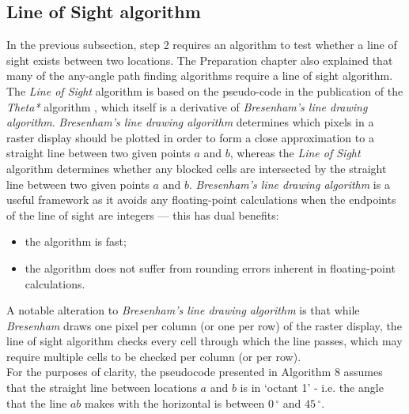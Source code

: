 \documentclass[12pt,notitlepage]{report}
\begin{document}
\subsection{Line of Sight algorithm}
In the previous subsection, step 2 requires an algorithm to test whether a line of sight exists between two locations. The Preparation chapter also explained that many of the any-angle path finding algorithms require a line of sight algorithm.\\

\noindent
The {\em Line of Sight} algorithm is based on the pseudo-code in the publication of the {\em Theta*} algorithm \cite{Daniel10}, which itself is a derivative of {\em Bresenham's line drawing algorithm}\cite{Bresenham65}. {\em Bresenham's line drawing algorithm} determines which pixels in a raster display should be plotted in order to form a close approximation to a straight line between two given points $a$ and $b$, whereas the {\em Line of Sight} algorithm determines whether any blocked cells are intersected by the straight line between two given points $a$ and $b$. {\em Bresenham's line drawing algorithm} is a useful framework as it avoids any floating-point calculations when the endpoints of the line of sight are integers --- this has dual benefits:
\begin{itemize}
\item the algorithm is fast;
\item the algorithm does not suffer from rounding errors inherent in floating-point calculations. 
\end{itemize}
\noindent
A notable alteration to {\em Bresenham's line drawing algorithm} is that while {\em Bresenham} draws one pixel per column (or one per row) of the raster display, the line of sight algorithm checks every cell through which the line passes, which may require multiple cells to be checked per column (or per row).\\

\noindent
For the purposes of clarity, the pseudocode presented in Algorithm 8 assumes that the straight line between locations $a$ and $b$ is in `octant 1' - i.e. the angle that the line $ab$ makes with the horizontal is between $0\,^{\circ}$ and $45\,^{\circ}$.\\
\end{document}

